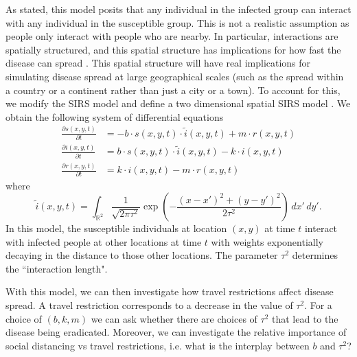 \documentclass[12pt, reqno]{amsart}
\begin{document}
    As stated, this model posits that any individual in the infected group can interact with any individual in the susceptible group. This is not a realistic assumption as people only interact with people who are nearby. In particular, interactions are spatially structured, and this spatial structure has implications for how fast the disease can spread \cite{ducasseQualitativePropertiesSpatial2020}. This spatial structure will have real implications for simulating disease spread at large geographical scales (such as the spread within a country or a continent rather than just a city or a town). To account for this, we modify the SIRS model and define a two dimensional spatial SIRS model \cite{baileySimulationStochasticEpidemics1967}. We obtain the following system of differential equations 
    \begin{align*}
        \frac{\partial s(x,y,t)}{\partial t} &= -b \cdot s(x, y, t) \cdot \widetilde{i}(x, y, t) + m \cdot r(x, y, t) \\
        \frac{\partial i(x, y, t)}{\partial t} &= b \cdot s(x, y, t) \cdot \widetilde{i}(x, y, t) - k \cdot i(x, y, t) \\
        \frac{\partial r(x, y, t)}{\partial t} &= k \cdot i(x, y, t) - m \cdot r(x, y, t)
    \end{align*}
    where 
    \begin{equation*}
        \widetilde{i}(x, y, t) = \int_{\mathbb{R}^2} \frac{1}{\sqrt{2\pi \tau^2}} \exp\left(-\frac{(x-x')^2 + (y-y')^2}{2\tau^2} \right) \, dx' \, dy'.
    \end{equation*}
    In this model, the susceptible individuals at location \((x, y)\) at time \(t\) interact with infected people at other locations at time \(t\) with weights exponentially decaying in the distance to those other locations. The parameter \(\tau^2\) determines the ``interaction length". 

    With this model, we can then investigate how travel restrictions affect disease spread. A travel restriction corresponds to a decrease in the value of \(\tau^2\). For a choice of \((b, k, m)\) we can ask whether there are choices of \(\tau^2\) that lead to the disease being eradicated. Moreover, we can investigate the relative importance of social distancing vs travel restrictions, i.e. what is the interplay between \(b\) and \(\tau^2\)? 
\end{document}
